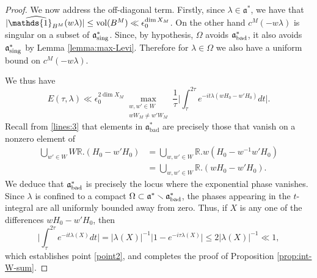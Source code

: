 \documentclass[12pt]{amsart}
\theoremstyle{remark}
\newcommand{\R}{\mathbb R}
\newcommand{\ga}{\mathfrak a}
\begin{document}
\begin{proof}
We now address the off-diagonal term. Firstly, since $\lambda \in \ga^*$, we have that $| \widehat{\mathds{1}_{B^M}}(w\lambda) | \le {\rm vol}(B^M) \ll \epsilon_0^{\dim X_M}$. On the other hand $c^M(-w \lambda)$ is singular on a subset of $\ga^*_{\textnormal{sing}}$. Since, by hypothesis, $\Omega$ avoids $\ga^*_{\textnormal{bad}}$, it also avoids  $\ga^*_{\textnormal{sing}}$ by Lemma \ref{lemma:max-Levi}. Therefore for $\lambda \in \Omega$ we also have a uniform bound on $c^M(-w \lambda)$. 

We thus have
\[
E(\tau, \lambda)\ll \epsilon_0^{2 \dim X_M} \max_{\substack{w, w' \in W \\ wW_M\neq w'W_M}} \frac{1}{\tau} \bigg|\int_{\tau}^{2\tau} e^{-it \lambda (wH_0-w'H_0)}  dt\bigg|.
\]
Recall from \eqref{lines:3} that elements in $\ga^*_{\textrm{bad}}$ are precisely those that vanish on a nonzero element of
\begin{align*}
\bigcup_{w'\in W} W\R.(H_0 - w'H_0)&=\bigcup_{w,w'\in W} \R. w(H_0 -w^{-1} w'H_0)\\
&=  \bigcup_{w,w'\in W} \R. (wH_0 - w'H_0).
\end{align*}
We deduce that $\ga^*_{\textnormal{bad}}$ is precisely the locus where the exponential phase vanishes. Since $\lambda$ is confined to a compact $\Omega\subset \ga^*\smallsetminus \ga^*_{\textnormal{bad}}$, the phases appearing in the $t$-integral are all uniformly bounded away from zero. Thus, if $X$ is any one of the differences $wH_0-w'H_0$, then 
\[
\bigg|\int_{\tau}^{2\tau} e^{-it \lambda (X)}  dt\bigg|=|\lambda(X)|^{-1}\big|1-e^{-i\tau\lambda(X)}\big|\le 2|\lambda(X)|^{-1}\ll 1,
\]
which establishes point \eqref{point2}, and completes the proof of Proposition \ref{prop:int-W-sum}.
\end{proof}
\end{document}
